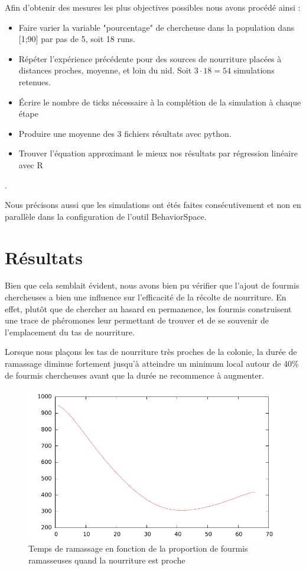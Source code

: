 \documentclass{article}
\begin{document}
Afin d'obtenir des mesures les plus objectives possibles nous avons procédé ainsi :
\begin{itemize}  
\item Faire varier la variable "pourcentage" de chercheuse dans la population dans [1;90] par pas de 5, soit 18 runs.
\item Répéter l'expérience précédente pour des sources de nourriture placées à distances proches, moyenne, et loin du nid. Soit \begin{math}3 \cdot 18 = 54\end{math} simulations retenues.
\item Écrire le nombre de ticks nécessaire à la complétion de la simulation à chaque étape
\item Produire une moyenne des 3 fichiers résultats avec python.
\item Trouver l'équation approximant le mieux nos résultats par régression linéaire avec R
\end{itemize}.

Nous précisons aussi que les simulations ont étés faites consécutivement et non en parallèle dans la configuration de l'outil BehaviorSpace.
\section{Résultats}
Bien que cela semblait évident, nous avons bien pu vérifier que l'ajout de fourmis chercheuses a bien une influence sur l'efficacité de la récolte de nourriture. En effet, plutôt que de chercher au hasard en permanence, les fourmis construisent une trace de phéromones leur permettant de trouver et de se souvenir de l'emplacement du tas de nourriture.

Lorsque nous plaçons les tas de nourriture très proches de la colonie, la durée de ramassage diminue fortement jusqu'à atteindre un minimum local autour de 40\% de fourmis chercheuses avant que la durée ne recommence à augmenter.

\begin{figure}[H]
\centering
\includegraphics[scale=0.6]{contenu/near.pdf}
\caption{Temps de ramassage en fonction de la proportion de fourmis ramasseuses quand la nourriture est proche}
\label{fig:proche}
\end{figure}
\end{document}
